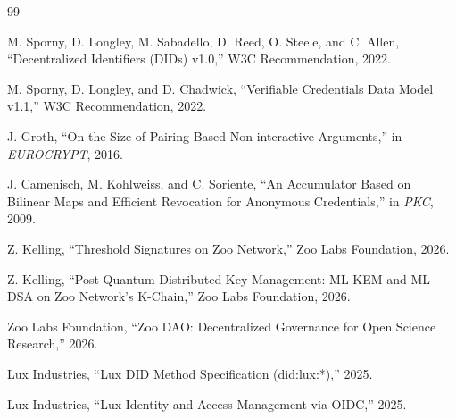 \documentclass[11pt,letterpaper]{article}
\theoremstyle{definition}
\theoremstyle{remark}
\begin{document}
\begin{thebibliography}{99}

M. Sporny, D. Longley, M. Sabadello, D. Reed, O. Steele, and C. Allen, ``Decentralized Identifiers (DIDs) v1.0,'' W3C Recommendation, 2022.

M. Sporny, D. Longley, and D. Chadwick, ``Verifiable Credentials Data Model v1.1,'' W3C Recommendation, 2022.

J. Groth, ``On the Size of Pairing-Based Non-interactive Arguments,'' in \textit{EUROCRYPT}, 2016.

J. Camenisch, M. Kohlweiss, and C. Soriente, ``An Accumulator Based on Bilinear Maps and Efficient Revocation for Anonymous Credentials,'' in \textit{PKC}, 2009.

Z. Kelling, ``Threshold Signatures on Zoo Network,'' Zoo Labs Foundation, 2026.

Z. Kelling, ``Post-Quantum Distributed Key Management: ML-KEM and ML-DSA on Zoo Network's K-Chain,'' Zoo Labs Foundation, 2026.

Zoo Labs Foundation, ``Zoo DAO: Decentralized Governance for Open Science Research,'' 2026.

Lux Industries, ``Lux DID Method Specification (did:lux:*),'' 2025.

Lux Industries, ``Lux Identity and Access Management via OIDC,'' 2025.

\end{thebibliography}
\end{document}
